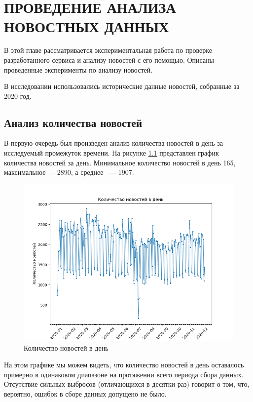 \chapter{ПРОВЕДЕНИЕ АНАЛИЗА НОВОСТНЫХ ДАННЫХ}
\label{chap:research}
\aftertitle

В этой главе рассматривается экспериментальная работа по проверке разработанного сервиса и анализу новостей с его помощью. Описаны проведенные эксперименты по анализу новостей.

В исследовании использовались исторические данные новостей, собранные за 2020 год.

\section{Анализ количества новостей}

В первую очередь был произведен анализ количества новостей в день за исследуемый промежуток времени. На рисунке \ref{img:news-count} представлен график количества новостей за день. Минимальное количество новостей в день 165, максимальное ~-- 2890, а среднее ~--- 1907.

\begin{figure}[h]
    \centering
    \includegraphics[width=\linewidth]{images/news-count.png}
    \caption{Количество новостей в день}
    \label{img:news-count}
\end{figure}

На этом графике мы можем видеть, что количество новостей в день оставалось примерно в одинаковом диапазоне на протяжении всего периода сбора данных. Отсутствие сильных выбросов (отличающихся в десятки раз) говорит о том, что, вероятно, ошибок в сборе данных допущено не было.

